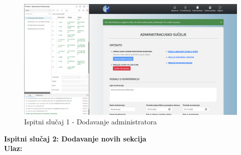			  \begin{figure}[H]
			 	\includegraphics[width= 15 cm, height= 25 cm, keepaspectratio]{slike/test_dodavanje_administratora.png} 
			 	\centering
			 	\caption{Ispitni slučaj 1 - Dodavanje administratora}
			 	\label{fig:act5}
			 \end{figure}
			
			 \noindent \textbf{Ispitni slučaj 2: Dodavanje novih sekcija}\\
			 \textbf{Ulaz:}

